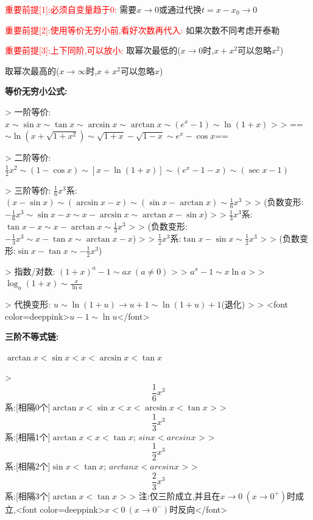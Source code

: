 \documentclass[11pt,a4paper,UTF8]{ctexart}
\begin{document}
\begin{thmbox}[{解法[3]: [代数]等价无穷小比阶}]

    \textcolor{red}{重要前提[1]:必须自变量趋于0:}		      需要$x \to 0$或通过代换$t = x - x_0 \to 0$

    \textcolor{red}{重要前提[2]:使用等价无穷小前,看好次数再代入:}	如果次数不同考虑开泰勒

    \textcolor{red}{重要前提[3]:上下同阶,可以放小:}		    取幂次最低的($x \to 0$时,$x+x^2$可以忽略$x^2$)

    						取幂次最高的($x \to \infty$时,$x+x^2$可以忽略$x$)

    \textbf{等价无穷小公式:}

    >   一阶等价:	$x \sim \sin x \sim \tan x \sim \arcsin x \sim \arctan x \sim (e^x - 1) \sim \ln(1+x)$
    >
    >   		==$\sim \ln(x+\sqrt{1+x^2}) \sim \sqrt{1+x} - \sqrt{1-x} \sim e^x - \cos x$==	

    >   二阶等价:	$\frac{1}{2}x^2 \sim (1 - \cos x) \sim [x - \ln(1+x)] \sim (e^x - 1 - x) \sim (\sec x - 1)$

    >   三阶等价:	$\frac{1}{6}x^3$系:$(x - \sin x) \sim (\arcsin x - x) \sim (\sin x - \arctan x) \sim \frac{1}{6}x^3$
    >
    >   			(负数变形:$- \frac{1}{6}x^3 \sim \sin x - x \sim x - \arcsin x \sim \arctan x - \sin x$)
    >
    >   		$\frac{1}{3}x^3$系:$\tan x - x \sim x - \arctan x \sim \frac{1}{3}x^3$
    >
    >   			(负数变形:$- \frac{1}{3}x^3 \sim x - \tan x \sim \arctan x - x$)
    >
    >   		$\frac{1}{2}x^3$系:$\tan x - \sin x \sim \frac{1}{2}x^3$
    >
    >   			(负数变形:$\sin x - \tan x \sim - \frac{1}{2}x^3$)

    >   指数/对数:     $(1+x)^a - 1 \sim a x\ (a \neq 0)$
    >
    >   		$a^x - 1 \sim x \ln a$
    >
    >   		$\log_a(1+x) \sim \frac{x}{\ln a}$

    >   代换变形:	$u \sim \ln(1+u) \to u+1 \sim \ln(1+u)+1$(退化) 
    >
    >   		<font color=deeppink>$u-1 \sim \ln u$</font>

    \textbf{三阶不等式链:} 

    $\arctan x < \sin x < x < \arcsin x < \tan x$

    >   
\begin{equation*}
\frac{1}{6}x^3
\end{equation*}
系:[相隔0个]$\arctan x < \sin x < x < \arcsin x < \tan x$
    >
    >   
\begin{equation*}
\frac{1}{3}x^3
\end{equation*}
系:[相隔1个]$\arctan x < x  < \tan x$;	$sinx<arcsinx$
    >
    >   
\begin{equation*}
\frac{1}{2}x^3
\end{equation*}
系:[相隔2个]$\sin x < \tan x$;	   $arctanx<arcsinx$
    >
    >   
\begin{equation*}
\frac{2}{3}x^3
\end{equation*}
系:[相隔3个]$\arctan x <\tan x$
    >
    >   注:仅三阶成立,并且在$x \to 0\ (x \to 0^+)$时成立,<font color=deeppink>$x < 0\ (x \to 0^-)$时反向</font>

\end{thmbox}
\end{document}
